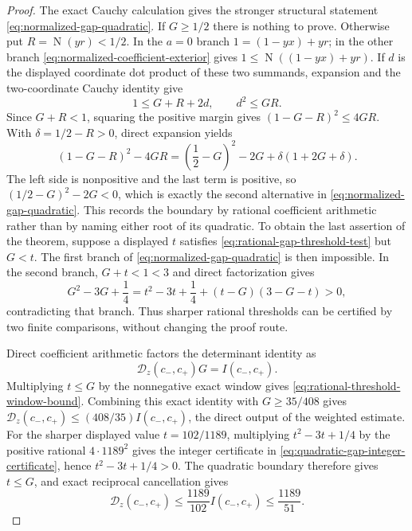 \documentclass[11pt]{article}
\newcommand{\Norm}[1]{\operatorname{N}\!\left(#1\right)}
\begin{document}
\begin{proof}
The exact Cauchy calculation gives the stronger structural statement
\eqref{eq:normalized-gap-quadratic}.  If $G\ge1/2$ there is nothing to prove.
Otherwise put $R=\Norm{yr}<1/2$.  In the $a=0$ branch
$1=(1-yx)+yr$; in the other branch
\eqref{eq:normalized-coefficient-exterior} gives
$1\le\Norm{(1-yx)+yr}$.  If $d$ is the displayed coordinate dot product of
these two summands, expansion and the two-coordinate Cauchy identity give
\[
 1\le G+R+2d,
 \qquad d^2\le GR.
\]
Since $G+R<1$, squaring the positive margin gives
$(1-G-R)^2\le4GR$.  With $\delta=1/2-R>0$, direct expansion yields
\[
 (1-G-R)^2-4GR
   =\left(\frac12-G\right)^2-2G
      +\delta(1+2G+\delta).
\]
The left side is nonpositive and the last term is positive, so
$(1/2-G)^2-2G<0$, which is exactly the second alternative in
\eqref{eq:normalized-gap-quadratic}.  This records the boundary by rational
coefficient arithmetic rather than by naming either root of its quadratic.
To obtain the last assertion of the theorem, suppose a displayed $t$
satisfies \eqref{eq:rational-gap-threshold-test} but $G<t$.  The first branch
of \eqref{eq:normalized-gap-quadratic} is then impossible.  In the second
branch, $G+t<1<3$ and direct factorization gives
\[
 G^2-3G+\frac14
 =t^2-3t+\frac14+(t-G)(3-G-t)>0,
\]
contradicting that branch.  Thus sharper rational thresholds can be certified
by two finite comparisons, without changing the proof route.

Direct coefficient arithmetic factors the determinant identity as
\begin{equation}
\label{eq:normalized-window-index}
\mathcal D_z(c_-,c_+)G=I(c_-,c_+).
\end{equation}
Multiplying $t\le G$ by the nonnegative exact window gives
\eqref{eq:rational-threshold-window-bound}.
Combining this exact identity with $G\ge35/408$ gives
$\mathcal D_z(c_-,c_+)\le(408/35)I(c_-,c_+)$, the direct output of the
weighted estimate.  For the sharper displayed value $t=102/1189$, multiplying
$t^2-3t+1/4$ by the positive rational $4\mathbin{\cdot}1189^2$ gives the
integer certificate in \eqref{eq:quadratic-gap-integer-certificate}, hence
$t^2-3t+1/4>0$.  The quadratic boundary therefore gives $t\le G$, and exact
reciprocal cancellation gives
\[
 \mathcal D_z(c_-,c_+)\le\frac{1189}{102}I(c_-,c_+)
   \le\frac{1189}{51}.
\]


\end{proof}
\end{document}
